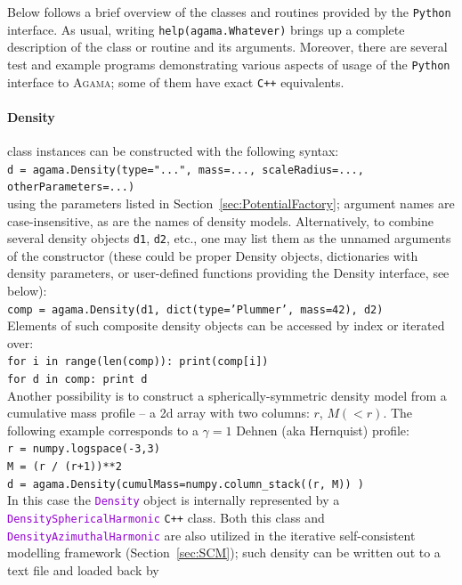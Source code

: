 \documentclass[12pt]{article}
\newcommand{\Agama}{\textsc{Agama}\xspace}
\newcommand{\Cpp}  {\texttt{C++}\xspace}
\newcommand{\Python}{\texttt{Python}\xspace}
\newcommand{\ttt}[1]{\textcolor{darkviolet}{\texttt{#1}}}
\begin{document}
Below follows a brief overview of the classes and routines provided by the \Python interface.
As usual, writing \texttt{help(agama.Whatever)} brings up a complete description of the class or routine and its arguments. Moreover, there are several test and example programs demonstrating various aspects of usage of the \Python interface to \Agama; some of them have exact \Cpp equivalents.

\paragraph{Density} class instances can be constructed with the following syntax: \\
\texttt{d = agama.Density(type="...", mass=..., scaleRadius=..., otherParameters=...)}\\
using the parameters listed in Section~\ref{sec:PotentialFactory}; argument names are case-insensitive, as are the names of density models. 
Alternatively, to combine several density objects \texttt{d1}, \texttt{d2}, etc., one may list them as the unnamed arguments of the constructor (these could be proper Density objects, dictionaries with density parameters, or user-defined functions providing the Density interface, see below):\\
\texttt{comp = agama.Density(d1, dict(type='Plummer', mass=42), d2)}\\[2mm]
Elements of such composite density objects can be accessed by index or iterated over:\\
\texttt{for i in range(len(comp)): print(comp[i])}\\
\texttt{for d in comp: print d}\\[2mm]
Another possibility is to construct a spherically-symmetric density model from a cumulative mass profile -- a 2d array with two columns: $r$, $M(<r)$. The following example corresponds to a $\gamma=1$ Dehnen (aka Hernquist) profile:\\
\texttt{r = numpy.logspace(-3,3)}\\
\texttt{M = (r / (r+1))**2}\\
\texttt{d = agama.Density(cumulMass=numpy.column_stack((r, M)) )}\\[2mm]
In this case the \ttt{Density} object is internally represented by a \ttt{DensitySphericalHarmonic} \Cpp class. Both this class and \ttt{DensityAzimuthalHarmonic} are also utilized in the iterative self-consistent modelling framework (Section~\ref{sec:SCM}); such density can be written out to a text file and loaded back by\\
\end{document}
